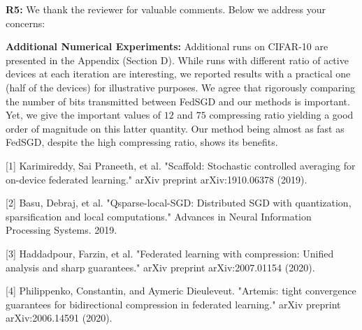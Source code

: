 \documentclass{article}
\begin{document}
\textbf{\textcolor{green!50!black}{R5:}} We thank the reviewer for valuable comments. Below we address your concerns:\vspace{-5pt}

\textbf{Additional Numerical Experiments:} Additional runs on CIFAR-10 are presented in the Appendix (Section D). While runs with different ratio of active devices at each iteration are interesting, we reported results with a practical one (half of the devices) for illustrative purposes.
We agree that rigorously comparing the number of bits transmitted between FedSGD and our methods is important.
Yet, we give the important values of $12$ and $75$ compressing ratio yielding a good order of magnitude on this latter quantity. 
Our method being almost as fast as FedSGD, despite the high compressing ratio, shows its benefits.

[1] Karimireddy, Sai Praneeth, et al. "Scaffold: Stochastic controlled averaging for on-device federated learning." arXiv preprint arXiv:1910.06378 (2019).\vspace{-1.8pt} 

[2] Basu, Debraj, et al. "Qsparse-local-SGD: Distributed SGD with quantization, sparsification and local computations." Advances in Neural Information Processing Systems. 2019.\vspace{-1.8pt} 

[3] Haddadpour, Farzin, et al. "Federated learning with compression: Unified analysis and sharp guarantees." arXiv preprint arXiv:2007.01154 (2020).\vspace{-1.8pt} 

[4] Philippenko, Constantin, and Aymeric Dieuleveut. "Artemis: tight convergence guarantees for bidirectional compression in federated learning." arXiv preprint arXiv:2006.14591 (2020).
\end{document}
